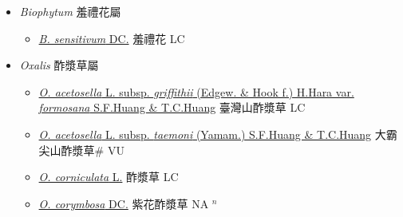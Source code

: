 
  \begin{itemize}
 \item[] \textit{Biophytum} 羞禮花屬
                    
  \begin{itemize}
        \item[] \href{http://www.theplantlist.org/tpl1.1/search?q=Biophytum+sensitivum}{\textit{B. sensitivum} DC.}   羞禮花 LC
  \end{itemize}
 \item[] \textit{Oxalis} 酢漿草屬
                    
  \begin{itemize}
        \item[] \href{http://www.theplantlist.org/tpl1.1/search?q=Oxalis+acetosella+subsp.+griffithii+var.+formosana}{\textit{O. acetosella} L. subsp. \textit{griffithii} (Edgew. \& Hook f.) H.Hara var. \textit{formosana} S.F.Huang \& T.C.Huang}   臺灣山酢漿草 LC
        \item[] \href{http://www.theplantlist.org/tpl1.1/search?q=Oxalis+acetosella+subsp.+taemoni}{\textit{O. acetosella} L. subsp. \textit{taemoni} (Yamam.) S.F.Huang \& T.C.Huang}   大霸尖山酢漿草\# VU
        \item[] \href{http://www.theplantlist.org/tpl1.1/search?q=Oxalis+corniculata}{\textit{O. corniculata} L.}   酢漿草 LC
        \item[] \href{http://www.theplantlist.org/tpl1.1/search?q=Oxalis+corymbosa}{\textit{O. corymbosa} DC.}   紫花酢漿草 NA $^n$
  \end{itemize}
  \end{itemize}

